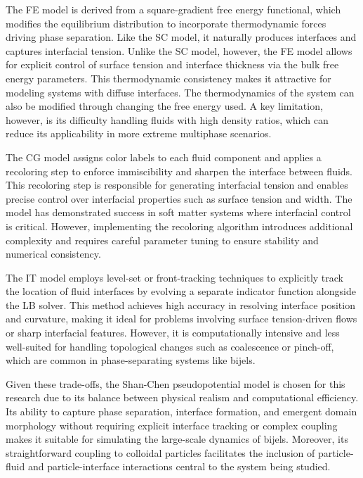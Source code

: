 The FE model is derived from a square-gradient free energy functional, which modifies the equilibrium distribution to incorporate thermodynamic 
forces driving phase separation. \cite{swift_lattice_1996, kendon_inertial_2001, briant_lattice_2004} Like the SC model, it naturally produces interfaces and captures interfacial tension. Unlike the SC model, however, 
the FE model allows for explicit control of surface tension and interface thickness via the bulk free energy parameters. This thermodynamic 
consistency makes it attractive for modeling systems with diffuse interfaces. The thermodynamics of the system can also be modified through changing the free energy used.
\cite{swift_lattice_1996, briant_lattice_2004, kendon_inertial_2001}
A key limitation, however, is its difficulty handling fluids with high density ratios, which can reduce its applicability in more extreme multiphase scenarios.

The CG model assigns color labels to each fluid component and applies a recoloring step to enforce immiscibility and sharpen the interface 
between fluids. 
\cite{mora_optimal_2021, latva-kokko_static_2005, huang_study_2014, liu_multiphase_2016}
This recoloring step is responsible for generating interfacial tension and enables precise control over interfacial properties such 
as surface tension and width. The model has demonstrated success in soft matter systems where interfacial control is critical. However, implementing 
the recoloring algorithm introduces additional complexity and requires careful parameter tuning to ensure stability and numerical consistency. \cite{mora_optimal_2021}

The IT model employs level-set or front-tracking techniques to explicitly track the location of fluid interfaces by evolving a separate indicator 
function alongside the LB solver. \cite{haghani_hassan_abadi_conservative_2018, liang_lattice_2023}
This method achieves high accuracy in resolving interface position and curvature, making it ideal for problems 
involving surface tension-driven flows or sharp interfacial features. However, it is computationally intensive and less well-suited for handling 
topological changes such as coalescence or pinch-off, which are common in phase-separating systems like bijels.

Given these trade-offs, the Shan-Chen pseudopotential model is chosen for this research due to its balance between physical realism and computational 
efficiency. \cite{jansen_bijels_2011,gunther_timescales_2014, gunther_lattice_2013, xie_direct_2017}
Its ability to capture phase separation, interface formation, and emergent domain morphology without requiring explicit interface 
tracking or complex coupling makes it suitable for simulating the large-scale dynamics of bijels. Moreover, its straightforward coupling to 
colloidal particles facilitates the inclusion of particle-fluid and particle-interface interactions central to the system being studied.


